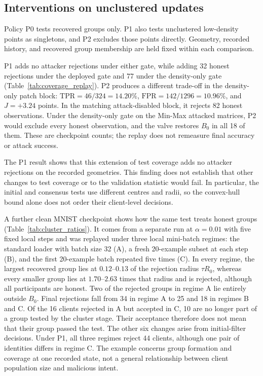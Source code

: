 \documentclass[journal]{IEEEtran}
\begin{document}
\subsection{Interventions on unclustered updates}

Policy P0 tests recovered groups only. P1 also tests unclustered low-density points as singletons, and P2 excludes those points directly. Geometry, recorded history, and recovered group membership are held fixed within each comparison.

P1 adds no attacker rejections under either gate, while adding 32 honest rejections under the deployed gate and 77 under the density-only gate (Table~\ref{tab:coverage_replay}). P2 produces a different trade-off in the density-only patch block: $\mathrm{TPR}=46/324=14.20\%$, $\mathrm{FPR}=142/1296=10.96\%$, and $J=+3.24$ points. In the matching attack-disabled block, it rejects 82 honest observations. Under the density-only gate on the Min-Max attacked matrices, P2 would exclude every honest observation, and the valve restores $B_0$ in all 18 of them. These are checkpoint counts; the replay does not remeasure final accuracy or attack success.

The P1 result shows that this extension of test coverage adds no attacker rejections on the recorded geometries. This finding does not establish that other changes to test coverage or to the validation statistic would fail. In particular, the initial and consensus tests use different centres and radii, so the convex-hull bound alone does not order their client-level decisions.


A further clean MNIST checkpoint shows how the same test treats honest groups (Table~\ref{tab:cluster_ratios}). It comes from a separate run at $\alpha=0.01$ with five fixed local steps and was replayed under three local mini-batch regimes: the standard loader with batch size 32 (A), a fresh 20-example subset at each step (B), and the first 20-example batch repeated five times (C). In every regime, the largest recovered group lies at $0.12$--$0.13$ of the rejection radius $\tau R_0$, whereas every smaller group lies at $1.70$--$2.63$ times that radius and is rejected, although all participants are honest. Two of the rejected groups in regime A lie entirely outside $B_0$. Final rejections fall from 34 in regime A to 25 and 18 in regimes B and C. Of the 16 clients rejected in A but accepted in C, 10 are no longer part of a group tested by the cluster stage. Their acceptance therefore does not mean that their group passed the test. The other six changes arise from initial-filter decisions. Under P1, all three regimes reject 44 clients, although one pair of identities differs in regime C. The example concerns group formation and coverage at one recorded state, not a general relationship between client population size and malicious intent.
\end{document}

